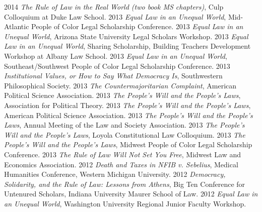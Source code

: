 \documentclass[letterpaper]{moderncv}
\begin{document}
\cvitem
{2014}
{\textit{The Rule of Law in the Real World (two book MS chapters)}, Culp Colloquium at Duke Law School.}
\vspace{1mm}
\cvitem
{2013}
{\textit{Equal Law in an Unequal World}, Mid-Atlantic People of Color Legal Scholarship Conference.}
\vspace{1mm}
\cvitem
{2013}
{\textit{Equal Law in an Unequal World}, Arizona State University Legal Scholars Workshop.}
\vspace{1mm}
\cvitem
{2013}
{\textit{Equal Law in an Unequal World}, Sharing Scholarship, Building Teachers Development Workshop at Albany Law School.}
\vspace{1mm}
\cvitem
{2013}
{\textit{Equal Law in an Unequal World}, Southeast/Southwest People of Color Legal Scholarship Conference.}
\vspace{1mm}
\cvitem
{2013}
{\textit{Institutional Values, or How to Say What Democracy Is}, Southwestern Philosophical Society.}
\vspace{1mm}
\cvitem
{2013}
{\textit{The Countermajoritarian Complaint}, American Political Science Association.}
\vspace{1mm}
\cvitem
{2013}
{\textit{The People's Will and the People's Laws}, Association for Political Theory.}
\vspace{1mm}
\cvitem
{2013}
{\textit{The People's Will and the People's Laws}, American Political Science Association.}
\vspace{1mm}
\cvitem
{2013}
{\textit{The People's Will and the People's Laws}, Annual Meeting of the Law and Society Association.}
\vspace{1mm}
\cvitem
{2013}
{\textit{The People's Will and the People's Laws}, Loyola Constitutional Law Colloquium.}
\vspace{1mm}
\cvitem
{2013}
{\textit{The People's Will and the People's Laws}, Midwest People of Color Legal Scholarship Conference.}
\vspace{1mm}
\cvitem
{2013}
{\textit{The Rule of Law Will Not Set You Free}, Midwest Law and Economics Association.}
\vspace{1mm}
\cvitem
{2012}
{\textit{Death and Taxes in NFIB v. Sebelius}, Medical Humanities Conference, Western Michigan University.}
\vspace{1mm}
\cvitem
{2012}
{\textit{Democracy, Solidarity, and the Rule of Law: Lessons from Athens}, Big Ten Conference for Untenured Scholars, Indiana University Maurer School of Law.}
\vspace{1mm}
\cvitem
{2012}
{\textit{Equal Law in an Unequal World}, Washington University Regional Junior Faculty Workshop.}
\end{document}
